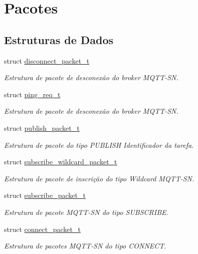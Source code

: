 \hypertarget{group__Pacotes}{\section{Pacotes}
\label{group__Pacotes}
}
\subsection*{Estruturas de Dados}
\begin{DoxyCompactItemize}
\item 
struct \hyperlink{structdisconnect__packet__t}{disconnect\+\_\+packet\+\_\+t}
\begin{DoxyCompactList}\small\item\em Estrutura de pacote de desconexão do broker M\+Q\+T\+T-\/\+S\+N. \end{DoxyCompactList}\item 
struct \hyperlink{structping__req__t}{ping\+\_\+req\+\_\+t}
\begin{DoxyCompactList}\small\item\em Estrutura de pacote de desconexão do broker M\+Q\+T\+T-\/\+S\+N. \end{DoxyCompactList}\item 
struct \hyperlink{structpublish__packet__t}{publish\+\_\+packet\+\_\+t}
\begin{DoxyCompactList}\small\item\em Estrutura de pacote do tipo P\+U\+B\+L\+I\+S\+H Identificador da tarefa. \end{DoxyCompactList}\item 
struct \hyperlink{structsubscribe__wildcard__packet__t}{subscribe\+\_\+wildcard\+\_\+packet\+\_\+t}
\begin{DoxyCompactList}\small\item\em Estrutura de pacote de inscrição do tipo Wildcard M\+Q\+T\+T-\/\+S\+N. \end{DoxyCompactList}\item 
struct \hyperlink{structsubscribe__packet__t}{subscribe\+\_\+packet\+\_\+t}
\begin{DoxyCompactList}\small\item\em Estrutura de pacote M\+Q\+T\+T-\/\+S\+N do tipo S\+U\+B\+S\+C\+R\+I\+B\+E. \end{DoxyCompactList}\item 
struct \hyperlink{structconnect__packet__t}{connect\+\_\+packet\+\_\+t}
\begin{DoxyCompactList}\small\item\em Estrutura de pacotes M\+Q\+T\+T-\/\+S\+N do tipo C\+O\+N\+N\+E\+C\+T. \end{DoxyCompactList}\item 

\end{DoxyCompactItemize}
